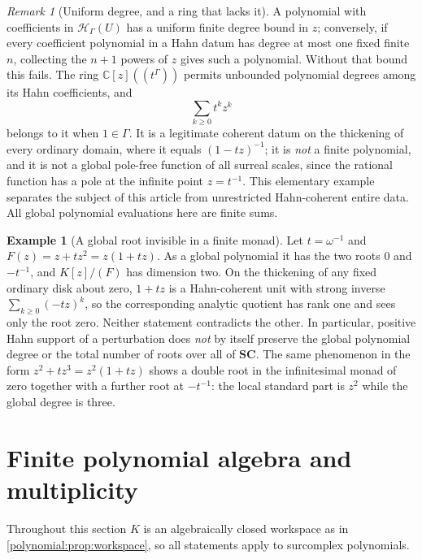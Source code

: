 \documentclass[11pt,letterpaper]{article}
\numberwithin{equation}{section}
\theoremstyle{definition}
\newtheorem{example}[theorem]{Example}
\theoremstyle{remark}\newtheorem{remark}[theorem]{Remark}
\newcommand{\SC}{\mathbf{SC}}
\newcommand{\C}{\mathbb C}
\newcommand{\HH}{\mathscr H_\Gamma}
\begin{document}
\begin{remark}[Uniform degree, and a ring that lacks it]\label{polynomial:rem:degree}
A polynomial with coefficients in $\HH(U)$ has a uniform finite degree bound
in $z$; conversely, if every coefficient polynomial in a Hahn datum has degree
at most one fixed finite $n$, collecting the $n+1$ powers of $z$ gives such a
polynomial. Without that bound this fails. The ring $\C[z]((t^\Gamma))$
permits unbounded polynomial degrees among its Hahn coefficients, and
\begin{equation}\label{polynomial:eq:geometricwarning}
 \sum_{k\ge0}t^kz^k
\end{equation}
belongs to it when $1\in\Gamma$. It is a legitimate coherent datum on the
thickening of every ordinary domain, where it equals $(1-tz)^{-1}$; it is
\emph{not} a finite polynomial, and it is not a global pole-free function of
all surreal scales, since the rational function has a pole at the infinite
point $z=t^{-1}$. This elementary example separates the subject of this
article from unrestricted Hahn-coherent entire data. All global polynomial
evaluations here are finite sums.
\end{remark}

\begin{example}[A global root invisible in a finite monad]\label{polynomial:ex:escape}
Let $t=\omega^{-1}$ and $F(z)=z+tz^2=z(1+tz)$. As a global polynomial it has
the two roots $0$ and $-t^{-1}$, and $K[z]/(F)$ has dimension two. On the
thickening of any fixed ordinary disk about zero, $1+tz$ is a Hahn-coherent
unit with strong inverse $\sum_{k\ge0}(-tz)^k$, so the corresponding analytic
quotient has rank one and sees only the root zero. Neither statement
contradicts the other. In particular, positive Hahn support of a perturbation
does \emph{not} by itself preserve the global polynomial degree or the total
number of roots over all of $\SC$. The same phenomenon in the form
$z^2+tz^3=z^2(1+tz)$ shows a double root in the infinitesimal monad of zero
together with a further root at $-t^{-1}$: the local standard part is $z^2$
while the global degree is three.
\end{example}

\section{Finite polynomial algebra and multiplicity}\label{polynomial:sec:algebra}
Throughout this section $K$ is an algebraically closed workspace as in
\cref{polynomial:prop:workspace}, so all statements apply to surcomplex
polynomials.
\end{document}
